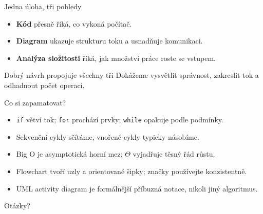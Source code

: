 \documentclass[aspectratio=169]{beamer}
\newcommand{\term}[1]{\textcolor{CodeBlue}{\textbf{#1}}}
\begin{document}
\begin{frame}{Jedna úloha, tři pohledy}
  \begin{itemize}
    \item \term{Kód} přesně říká, co vykoná počítač.
    \item \term{Diagram} ukazuje strukturu toku a usnadňuje komunikaci.
    \item \term{Analýza složitosti} říká, jak množství práce roste se vstupem.
  \end{itemize}
  \begin{block}{Dobrý návrh propojuje všechny tři}
    Dokážeme vysvětlit správnost, zakreslit tok a odhadnout počet operací.
  \end{block}
\end{frame}

\begin{frame}{Co si zapamatovat?}
  \begin{itemize}
    \item \texttt{if} větví tok; \texttt{for} prochází prvky; \texttt{while} opakuje podle podmínky.
    \item Sekvenční cykly sčítáme, vnořené cykly typicky násobíme.
    \item Big O je asymptotická horní mez; \(\Theta\) vyjadřuje těsný řád růstu.
    \item Flowchart tvoří uzly a orientované šipky; značky používejte konzistentně.
    \item UML activity diagram je formálnější příbuzná notace, nikoli jiný algoritmus.
  \end{itemize}
  \vspace{3mm}
  \centering\Large Otázky?
\end{frame}
\end{document}
